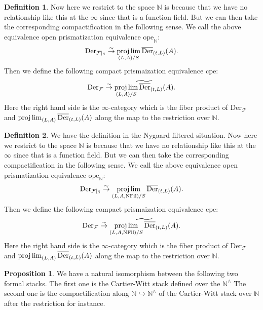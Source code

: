 \documentclass[12pt]{article}
\theoremstyle{definition}
\newtheorem{definition}{Definition}
\newtheorem{proposition}{Proposition}
\begin{document}
\begin{definition}
Now here we restrict to the space $\mathbb{N}$ is because that we have no relationship like this at the $\infty$ since that is a function field. But we can then take the corresponding compactification in the following sense. We call the above equivalence open prismatization equivalence $\mathrm{ope}_\mathbb{N}$:
\begin{align}
\mathrm{Der}_{\mathcal{F}|_{\mathbb{N}}}\overset{\sim}{\rightarrow} \projlim_{(L,A)/S}\overline{\mathrm{Der}}_{(t,L)}(A).
\end{align}
Then we define the following compact prismaization equivalence $\mathrm{cpe}$:
\begin{align}
\mathrm{Der}_{\mathcal{F}}\overset{\sim}{\rightarrow} \widetilde{\projlim_{(L,A)/S}\overline{\mathrm{Der}}_{(t,L)}(A)}.
\end{align}
Here the right hand side is the $\infty$-category which is the fiber product of $\mathrm{Der}_{\mathcal{F}}$ and $\projlim_{(L,A)}\overline{\mathrm{Der}}_{(t,L)}(A)$ along the map to the restriction over $\mathbb{N}$. 
\end{definition}

\begin{definition}
We have the definition in the Nygaard filtered situation. Now here we restrict to the space $\mathbb{N}$ is because that we have no relationship like this at the $\infty$ since that is a function field. But we can then take the corresponding compactification in the following sense. We call the above equivalence open prismatization equivalence $\mathrm{ope}_\mathbb{N}$:
\begin{align}
\mathrm{Der}_{\mathcal{F}|_{\mathbb{N}}}\overset{\sim}{\rightarrow} \projlim_{(L,A,\mathrm{NFil})/S}\overline{\mathrm{Der}}_{(t,L)}(A).
\end{align}
Then we define the following compact prismaization equivalence $\mathrm{cpe}$:
\begin{align}
\mathrm{Der}_{\mathcal{F}}\overset{\sim}{\rightarrow} \widetilde{\projlim_{(L,A,\mathrm{NFil})/S}\overline{\mathrm{Der}}_{(t,L)}(A)}.
\end{align}
Here the right hand side is the $\infty$-category which is the fiber product of $\mathrm{Der}_{\mathcal{F}}$ and $\projlim_{(L,A)}\overline{\mathrm{Der}}_{(t,L)}(A)$ along the map to the restriction over $\mathbb{N}$. 
\end{definition}

\begin{proposition}
We have a natural isomorphism between the following two formal stacks. The first one is the Cartier-Witt stack defined over the $\mathbb{N}^\wedge$ The second one is the compactification along $\mathbb{N}\hookrightarrow \mathbb{N}^\wedge$ of the Cartier-Witt stack over $\mathbb{N}$ after the restriction for instance.
\end{proposition}
\end{document}
